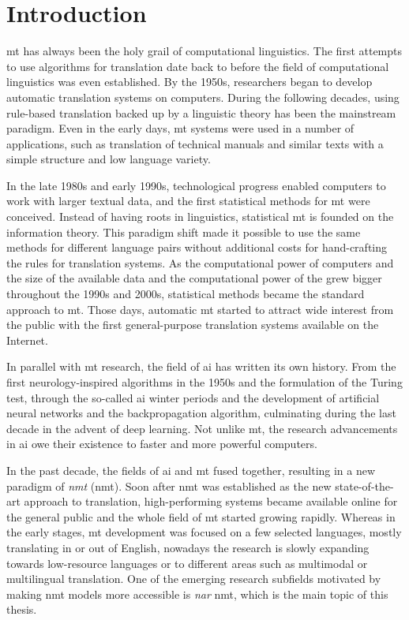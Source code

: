 \chapter{Introduction}%
\label{chap:intro}

\Ac{mt} has always been the holy grail of computational linguistics. The first
attempts to use algorithms for translation date back to before the field of
computational linguistics was even established. By the 1950s, researchers began
to develop automatic translation systems on computers. During the following
decades, using rule-based translation backed up by a linguistic theory has been
the mainstream paradigm. Even in the early days, \ac{mt} systems were used in a
number of applications, such as translation of technical manuals and similar
texts with a simple structure and low language variety.

In the late 1980s and early 1990s, technological progress enabled computers to
work with larger textual data, and the first statistical methods for \ac{mt}
were conceived. Instead of having roots in linguistics, statistical \ac{mt} is
founded on the information theory. This paradigm shift made it possible to use
the same methods for different language pairs without additional costs for
hand-crafting the rules for translation systems. As the computational power of
computers and the size of the available data and the computational power of the
grew bigger throughout the 1990s and 2000s, statistical methods became the
standard approach to \ac{mt}. Those days, automatic \ac{mt} started to attract
wide interest from the public with the first general-purpose translation
systems available on the Internet.

In parallel with \ac{mt} research, the field of \ac{ai} has written its own
history. From the first neurology-inspired algorithms in the 1950s and the
formulation of the Turing test, through the so-called \ac{ai} winter periods
and the development of artificial neural networks and the backpropagation
algorithm, culminating during the last decade in the advent of deep learning.
Not unlike \ac{mt}, the research advancements in \ac{ai} owe their existence to
faster and more powerful computers.

In the past decade, the fields of \ac{ai} and \ac{mt} fused together, resulting
in a new paradigm of \emph{\acl{nmt}} (\acs{nmt}). Soon after
\ac{nmt} was established as the new state-of-the-art approach to translation,
high-performing systems became available online for the general public and the
whole field of \ac{mt} started growing rapidly. Whereas in the early stages,
\ac{mt} development was focused on a few selected languages, mostly translating
in or out of English, nowadays the research is slowly expanding towards
low-resource languages or to different areas such as multimodal or multilingual
translation. One of the emerging research subfields motivated by making
\ac{nmt} models more accessible is \emph{\acl{nar}} \ac{nmt}, which is the main
topic of this thesis.

